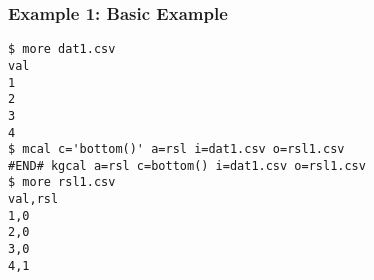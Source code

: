 \subsubsection*{Example 1: Basic Example}



\begin{Verbatim}[baselinestretch=0.7,frame=single]
$ more dat1.csv
val
1
2
3
4
$ mcal c='bottom()' a=rsl i=dat1.csv o=rsl1.csv
#END# kgcal a=rsl c=bottom() i=dat1.csv o=rsl1.csv
$ more rsl1.csv
val,rsl
1,0
2,0
3,0
4,1
\end{Verbatim}
